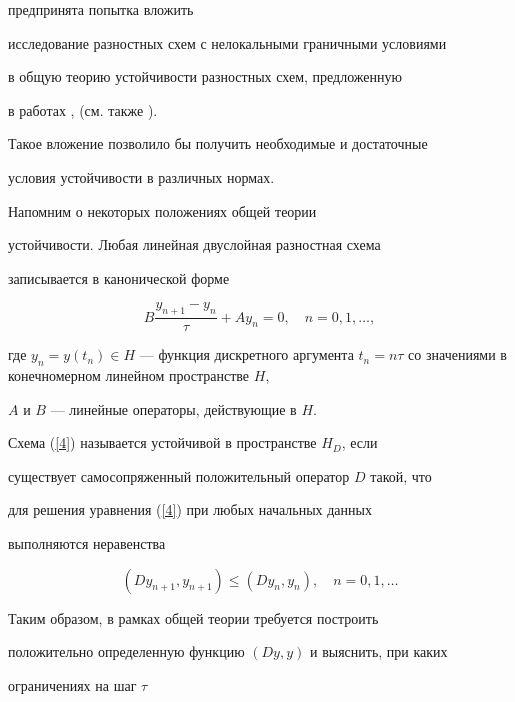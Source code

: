 \cite{11} предпринята попытка вложить


исследование разностных схем с нелокальными граничными условиями


в общую теорию устойчивости разностных схем, предложенную 


в работах \cite{12}, \cite{13} (см. также \cite{14}).


Такое вложение позволило бы получить необходимые и достаточные


условия устойчивости в различных нормах.








Напомним о некоторых положениях общей теории


устойчивости. Любая линейная двуслойная разностная схема


записывается в канонической форме 


\begin{equation}\label{4}


B\frac{{y_{n+1}-y_n}} {\tau}+Ay_n=0,\quad n=0,1,\dotsc,


\end{equation}


где $y_n=y(t_n)\in H$ --- функция дискретного аргумента $t_n=


n\tau$ со значениями в конечномерном линейном пространстве $H$,


$A$ и $B$ --- линейные операторы, действующие в $H$.





Схема (\ref{4}) называется устойчивой в пространстве $H_{D}$, если


существует самосопряженный положительный оператор $D$ такой, что


для решения уравнения (\ref{4}) при любых начальных данных


выполняются неравенства


\begin{equation}\label{5}


(Dy_{n+1},y_{n+1}) \leqslant (Dy_n,y_n),\quad n=0,1,\dotsc


\end{equation}


Таким образом, в рамках общей теории требуется построить 


положительно определенную функцию $(Dy,y)$ и выяснить, при каких 


ограничениях на шаг $\tau$


